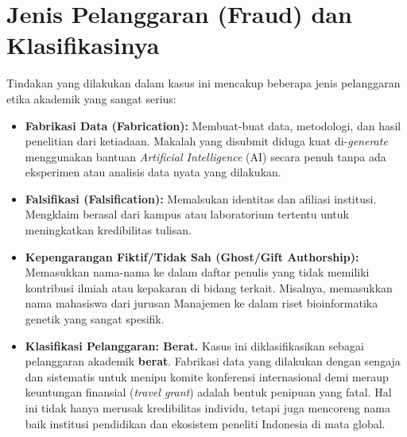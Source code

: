 \documentclass[12pt, a4paper]{article}
\begin{document}
\section{Jenis Pelanggaran (Fraud) dan Klasifikasinya}
Tindakan yang dilakukan dalam kasus ini mencakup beberapa jenis pelanggaran etika akademik yang sangat serius:
\begin{itemize}
  \item \textbf{Fabrikasi Data (Fabrication):} Membuat-buat data, metodologi, dan hasil penelitian dari ketiadaan. Makalah yang disubmit diduga kuat di-\textit{generate} menggunakan bantuan \textit{Artificial Intelligence} (AI) secara penuh tanpa ada eksperimen atau analisis data nyata yang dilakukan.
  \item \textbf{Falsifikasi (Falsification):} Memalsukan identitas dan afiliasi institusi. Mengklaim berasal dari kampus atau laboratorium tertentu untuk meningkatkan kredibilitas tulisan.
  \item \textbf{Kepengarangan Fiktif/Tidak Sah (Ghost/Gift Authorship):} Memasukkan nama-nama ke dalam daftar penulis yang tidak memiliki kontribusi ilmiah atau kepakaran di bidang terkait. Misalnya, memasukkan nama mahasiswa dari jurusan Manajemen ke dalam riset bioinformatika genetik yang sangat spesifik.
  \item \textbf{Klasifikasi Pelanggaran: Berat.} Kasus ini diklasifikasikan sebagai pelanggaran akademik \textbf{berat}. Fabrikasi data yang dilakukan dengan sengaja dan sistematis untuk menipu komite konferensi internasional demi meraup keuntungan finansial (\textit{travel grant}) adalah bentuk penipuan yang fatal. Hal ini tidak hanya merusak kredibilitas individu, tetapi juga mencoreng nama baik institusi pendidikan dan ekosistem peneliti Indonesia di mata global.
\end{itemize}
\end{document}
